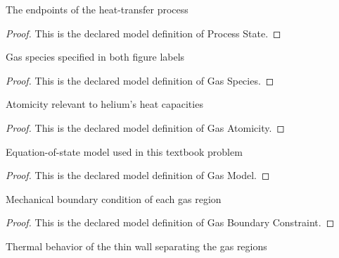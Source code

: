 \begin{definition}
  \label{def:physics:phyx-mini-0436:phyxminiproblems-problemphyxmini0436-processstate}
  The endpoints of the heat-transfer process
\end{definition}
\begin{proof}
  This is the declared model definition of Process State.
\end{proof}
\begin{definition}
  \label{def:physics:phyx-mini-0436:phyxminiproblems-problemphyxmini0436-gasspecies}
  Gas species specified in both figure labels
\end{definition}
\begin{proof}
  This is the declared model definition of Gas Species.
\end{proof}
\begin{definition}
  \label{def:physics:phyx-mini-0436:phyxminiproblems-problemphyxmini0436-gasatomicity}
  Atomicity relevant to helium's heat capacities
\end{definition}
\begin{proof}
  This is the declared model definition of Gas Atomicity.
\end{proof}
\begin{definition}
  \label{def:physics:phyx-mini-0436:phyxminiproblems-problemphyxmini0436-gasmodel}
  Equation-of-state model used in this textbook problem
\end{definition}
\begin{proof}
  This is the declared model definition of Gas Model.
\end{proof}
\begin{definition}
  \label{def:physics:phyx-mini-0436:phyxminiproblems-problemphyxmini0436-gasboundaryconstraint}
  Mechanical boundary condition of each gas region
\end{definition}
\begin{proof}
  This is the declared model definition of Gas Boundary Constraint.
\end{proof}
\begin{definition}
  \label{def:physics:phyx-mini-0436:phyxminiproblems-problemphyxmini0436-separatingwallmodel}
  Thermal behavior of the thin wall separating the gas regions
\end{definition}
